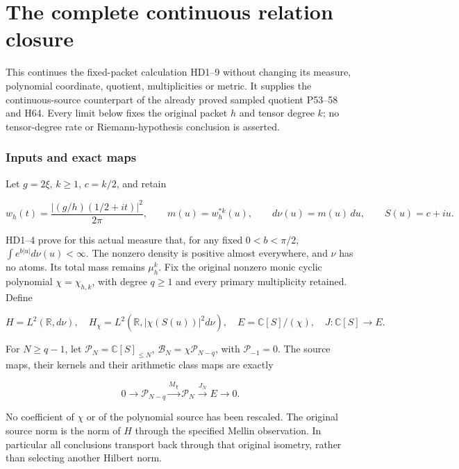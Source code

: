 \begingroup

\section{The complete continuous relation closure}



This continues the fixed-packet calculation HD1--9 without changing its measure, polynomial coordinate, quotient, multiplicities or metric. It supplies the continuous-source counterpart of the already proved sampled quotient P53--58 and H64. Every limit below fixes the original packet \(h\) and tensor degree \(k\); no tensor-degree rate or Riemann-hypothesis conclusion is asserted.

\subsubsection{Inputs and exact maps}\label{inputs-and-exact-maps}

Let \(g=2\xi\), \(k\ge1\), \(c=k/2\), and retain

\[
w_h(t)=\frac{|(g/h)(1/2+it)|^2}{2\pi},\qquad
m(u)=w_h^{*k}(u),\qquad d\nu(u)=m(u)\,du,\qquad S(u)=c+iu.
\tag{CR1}
\]

HD1--4 prove for this actual measure that, for any fixed \(0<b<\pi/2\), \(\int e^{b|u|}d\nu(u)<\infty\). The nonzero density is positive almost everywhere, and \(\nu\) has no atoms. Its total mass remains \(\mu_h^k\). Fix the original nonzero monic cyclic polynomial \(\chi=\chi_{h,k}\), with degree \(q\ge1\) and every primary multiplicity retained. Define

\[
H=L^2(\mathbb R,d\nu),\quad H_\chi=L^2(\mathbb R,|\chi(S(u))|^2d\nu),
\quad E=\mathbb C[S]/(\chi),\quad J:\mathbb C[S]\longrightarrow E.
\tag{CR2}
\]

For \(N\ge q-1\), let \(\mathcal P_N=\mathbb C[S]_{\le N}\), \(\mathcal B_N=\chi\mathcal P_{N-q}\), with \(\mathcal P_{-1}=0\). The source maps, their kernels and their arithmetic class maps are exactly

\[
0\longrightarrow\mathcal P_{N-q}\xrightarrow{M_\chi}
\mathcal P_N\xrightarrow{J_N}E\longrightarrow0.
\tag{CR3}
\]

No coefficient of \(\chi\) or of the polynomial source has been rescaled. The original source norm is the norm of \(H\) through the specified Mellin observation. In particular all conclusions transport back through that original isometry, rather than selecting another Hilbert norm.

